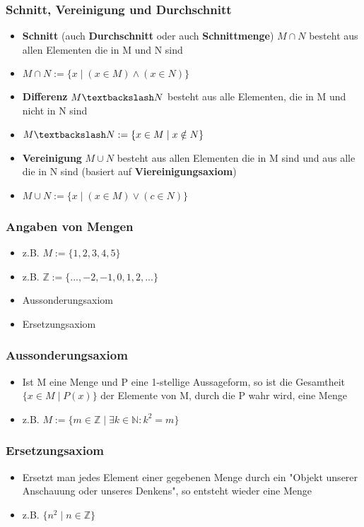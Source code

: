 \documentclass[titlepage]{article}
\newcommand{\N}{\mathbb{N}}
\newcommand{\1}{\mathbb{1}}
\newcommand{\0}{\mathbb{0}}
\newcommand{\Z}{\mathbb{Z}}
\begin{document}
				\subsubsection{Schnitt, Vereinigung und Durchschnitt}
					\begin{itemize}
						\item \textbf{Schnitt} (auch \textbf{Durchschnitt} oder auch \textbf{Schnittmenge}) $M\cap N$ besteht aus allen Elementen die in M und N sind
						\item $M\cap N:=\{x\mid(x\in M)\wedge(x\in N)\}$\\
						\item \textbf{Differenz} $M\textbackslash N$ besteht aus alle Elementen, die in M und nicht in N sind
						\item $M \textbackslash N:=\{x\in M\mid x\notin N\}$\\
						\item \textbf{Vereinigung} $M\cup N$ besteht aus allen Elementen die in M sind und aus alle die in N sind (basiert auf \textbf{Viereinigungsaxiom})
						\item $M \cup N:=\{x\mid(x\in M)\vee(c\in N)\}$
					\end{itemize}
				\subsubsection{Angaben von Mengen}
					\begin{itemize}
						\item z.B. $M:=\{1,2,3,4,5\}$
						\item z.B. $\Z:=\{...,-2,-1,0,1,2,...\}$
						\item Aussonderungsaxiom
						\item Ersetzungsaxiom
					\end{itemize}
				\subsubsection{Aussonderungsaxiom}
					\begin{itemize}
						\item Ist M eine Menge und P eine 1-stellige Aussageform, so ist die Gesamtheit $\{x\in M\mid P(x)\}$ der Elemente von M, durch die P wahr wird, eine Menge
						\item z.B. $M:=\{m\in\Z\mid\exists k\in\N:k^2=m\}$
					\end{itemize}
				\subsubsection{Ersetzungsaxiom}
					\begin{itemize}
						\item Ersetzt man jedes Element einer gegebenen Menge durch ein "Objekt unserer Anschauung oder unseres Denkens", so entsteht wieder eine Menge
						\item z.B. $\{n^2\mid n\in\Z\}$
					\end{itemize}
\end{document}
